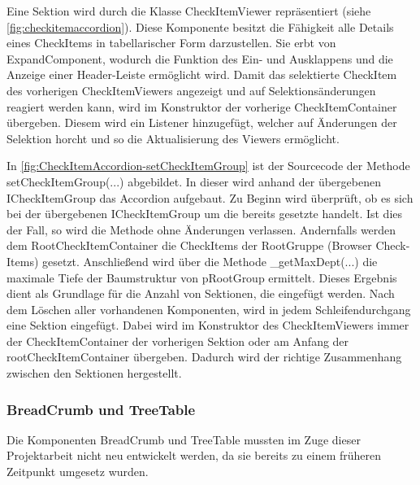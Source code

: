 Eine Sektion wird durch die Klasse CheckItemViewer repräsentiert (siehe \autoref{fig:checkitemaccordion}). Diese Komponente besitzt die Fähigkeit alle Details eines CheckItems in tabellarischer Form darzustellen. Sie erbt von ExpandComponent, wodurch die Funktion des Ein- und Ausklappens und die Anzeige einer Header-Leiste ermöglicht wird. Damit das selektierte CheckItem des vorherigen CheckItemViewers angezeigt und auf Selektionsänderungen reagiert werden kann, wird im Konstruktor der vorherige CheckItemContainer übergeben. Diesem wird ein Listener hinzugefügt, welcher auf Änderungen der Selektion horcht und so die Aktualisierung des Viewers ermöglicht.



In \autoref{fig:CheckItemAccordion-setCheckItemGroup} ist der Sourcecode der Methode setCheckItemGroup(...) abgebildet. In dieser wird anhand der übergebenen ICheckItemGroup das Accordion aufgebaut. Zu Beginn wird überprüft, ob es sich bei der übergebenen ICheckItemGroup um die bereits gesetzte handelt. Ist dies der Fall, so wird die Methode ohne Änderungen verlassen. Andernfalls werden dem RootCheckItemContainer die CheckItems der RootGruppe (Browser Check-Items) gesetzt. Anschließend wird über die Methode \_getMaxDept(...) die maximale Tiefe der Baumstruktur von pRootGroup ermittelt. Dieses Ergebnis dient als Grundlage für die Anzahl von Sektionen, die eingefügt werden. Nach dem Löschen aller vorhandenen Komponenten, wird in jedem Schleifendurchgang eine Sektion eingefügt. Dabei wird im Konstruktor des CheckItemViewers immer der CheckItemContainer der vorherigen Sektion oder am Anfang der rootCheckItemContainer übergeben. Dadurch wird der richtige Zusammenhang zwischen den Sektionen hergestellt.

\subsubsection{BreadCrumb und TreeTable}

Die Komponenten BreadCrumb und TreeTable mussten im Zuge dieser Projektarbeit nicht neu entwickelt werden, da sie bereits zu einem früheren Zeitpunkt umgesetz wurden. 

